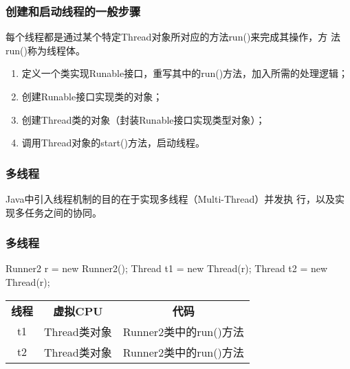 \begin{frame}[fragile] %
  \frametitle{创建和启动线程的一般步骤}

  每个线程都是通过某个特定Thread对象所对应的方法run()来完成其操作，方
  法run()称为{\hei\Red 线程体}。
  
  \begin{enumerate}[<+-| alert@+>]\kai
  \item 定义一个类实现Runable接口，重写其中的run()方法，加入所需的处理逻辑；
  \item 创建Runable接口实现类的对象；
  \item 创建Thread类的对象（封装Runable接口实现类型对象）；
  \item 调用Thread对象的start()方法，启动线程。
  \end{enumerate}

\end{frame}

\begin{frame}[fragile] %
  \frametitle{多线程}

  Java中引入线程机制的目的在于实现{\hei\Red 多线程（Multi-Thread）并发执
    行，以及实现多任务之间的协同}。


\end{frame}

\begin{frame}[fragile] %
  \frametitle{多线程}


  \begin{javaCode}
    Runner2 r = new Runner2();
    Thread t1 = new Thread(r);
    Thread t2 = new Thread(r);
  \end{javaCode}
  \begin{table}
    \footnotesize
    \setlength{\extrarowheight}{1.2mm}
    \begin{tabular}{c|c|c}
      {\bf 线程} & {\bf 虚拟CPU} & {\bf 代码} \\
      t1 & Thread类对象 & Runner2类中的run()方法 \\
      t2 & Thread类对象 & Runner2类中的run()方法 \\
    \end{tabular}
  \end{table}
\end{frame}

